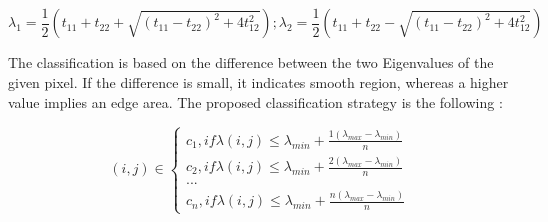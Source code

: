 \documentclass[draft,final]{vutinfth} %
\begin{document}
\begin{equation}
\lambda_1 = \frac{1}{2}(t_{11} + t_{22} + \sqrt{(t_{11}-t_{22})^2 + 4t_{12}^2});
\lambda_2 = \frac{1}{2}(t_{11} + t_{22} - \sqrt{(t_{11}-t_{22})^2 + 4t_{12}^2})
\label{eig}
\end{equation}

The classification is based on the difference between the two Eigenvalues of the given pixel.
If the difference is small, it indicates smooth region, whereas a higher value implies an edge area.
The proposed classification strategy is the following \cite{zeng2011region}:

\begin{equation}
(i, j)\in \left\{
                \begin{array}{ll}
                  c_1, if \lambda(i,j) \leq \lambda_{min} + \frac{1(\lambda_{max} - \lambda_{min})}{n}\\
                  c_2, if \lambda(i,j) \leq \lambda_{min} + \frac{2(\lambda_{max} - \lambda_{min})}{n}\\
				... \\
                   c_n, if \lambda(i,j) \leq \lambda_{min} + \frac{n(\lambda_{max} - \lambda_{min})}{n}
                \end{array}
              \right.
\end{equation}
\end{document}
